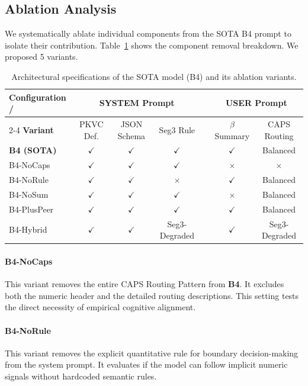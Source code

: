 \documentclass[11pt]{article}
\begin{document}
\subsection{Ablation Analysis}
We systematically ablate individual components from the SOTA B4 prompt to isolate their contribution. Table~\ref{tab:ablation_component} shows the component removal breakdown. We proposed 5 variants.

\begin{table}[h]
\centering
\small
\caption{Architectural specifications of the SOTA model (B4) and its ablation variants.}
\label{tab:ablation_component}
\begin{tabular}{l ccc c cc}
\toprule
\textbf{Configuration /} & \multicolumn{3}{c}{\textbf{SYSTEM Prompt}} & & \multicolumn{2}{c}{\textbf{USER Prompt}} \\
\cline{2-4} \cline{6-7}
\textbf{Variant} & PKVC Def. & JSON Schema & Seg3 Rule & & $\beta$ Summary & CAPS Routing \\
\midrule
\textbf{B4 (SOTA)} & $\checkmark$ & $\checkmark$ & $\checkmark$ & & $\checkmark$ & Balanced \\
B4-NoCaps & $\checkmark$ & $\checkmark$ & $\checkmark$ & & $\times$ & $\times$ \\
B4-NoRule & $\checkmark$ & $\checkmark$ & $\times$ & & $\checkmark$ & Balanced \\
B4-NoSum & $\checkmark$ & $\checkmark$ & $\checkmark$ & & $\times$ & Balanced \\
B4-PlusPeer & $\checkmark$ & $\checkmark$ & $\checkmark$ & & $\checkmark$ & Balanced \\
B4-Hybrid & $\checkmark$ & $\checkmark$ & Seg3-Degraded & & $\checkmark$ & Seg3-Degraded \\
\bottomrule
\end{tabular}
\end{table}

\paragraph{B4-NoCaps}
This variant removes the entire CAPS Routing Pattern from \textbf{B4}. It excludes both the numeric header and the detailed routing descriptions. This setting tests the direct necessity of empirical cognitive alignment.

\paragraph{B4-NoRule}
This variant removes the explicit quantitative rule for boundary decision-making from the system prompt. It evaluates if the model can follow implicit numeric signals without hardcoded semantic rules.
\end{document}
